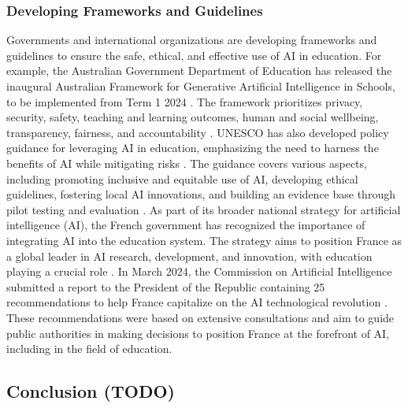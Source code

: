 \documentclass{article}
\begin{document}



\subsubsection{Developing Frameworks and Guidelines} %
Governments and international organizations are developing
frameworks and guidelines to ensure the safe, ethical,
and effective use of AI in education. For example,
the Australian Government Department of Education has released
the inaugural Australian Framework for Generative Artificial
Intelligence in Schools, to be implemented from
Term 1 2024 \cite{educationmatters_ai_framework}.
The framework prioritizes privacy, security, safety,
teaching and learning outcomes, human and social wellbeing,
transparency, fairness, and accountability
\cite{educationmatters_ai_framework}.
UNESCO has also developed policy guidance for leveraging
AI in education, emphasizing the need to harness the benefits
of AI while mitigating risks
\cite{teachingtomorrow_ai_education}. The guidance covers
various aspects, including promoting inclusive and
equitable use of AI, developing ethical guidelines,
fostering local AI innovations, and building an evidence
base through pilot testing and evaluation
\cite{teachingtomorrow_ai_education}.
As part of its broader national strategy for artificial intelligence
(AI), the French government has recognized the importance
of integrating AI into the education system. The strategy
aims to position France as a global leader in AI research,
development, and innovation, with education playing
a crucial role \cite{economie_gouv_ai_strategy}
\cite{entreprises_gouv_ai_strategy}. In March 2024, the
Commission on Artificial Intelligence submitted a report
to the President of the Republic containing 25 recommendations
to help France capitalize on the AI technological
revolution \cite{edunumrech_ai_recommendations}
\cite{ac_paris_ai_education}
\cite{campusmatin_ai_recommendations}.
These recommendations were based on extensive consultations and aim to guide public authorities in making decisions to position France at the forefront of AI, including in the field of education.



\subsection{Conclusion (TODO)} %
\end{document}
